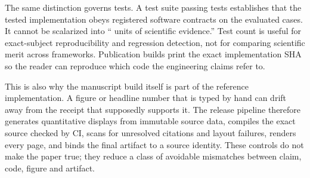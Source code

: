 The same distinction governs tests. A test suite passing \SoftwareTests{} tests establishes that the tested implementation obeys registered software contracts on the evaluated cases. It cannot be scalarized into ``\SoftwareTests{} units of scientific evidence.'' Test count is useful for exact-subject reproducibility and regression detection, not for comparing scientific merit across frameworks. Publication builds print the exact implementation SHA so the reader can reproduce which code the engineering claims refer to.

This is also why the manuscript build itself is part of the reference implementation. A figure or headline number that is typed by hand can drift away from the receipt that supposedly supports it. The release pipeline therefore generates quantitative displays from immutable source data, compiles the exact source checked by CI, scans for unresolved citations and layout failures, renders every page, and binds the final artifact to a source identity. These controls do not make the paper true; they reduce a class of avoidable mismatches between claim, code, figure and artifact.
